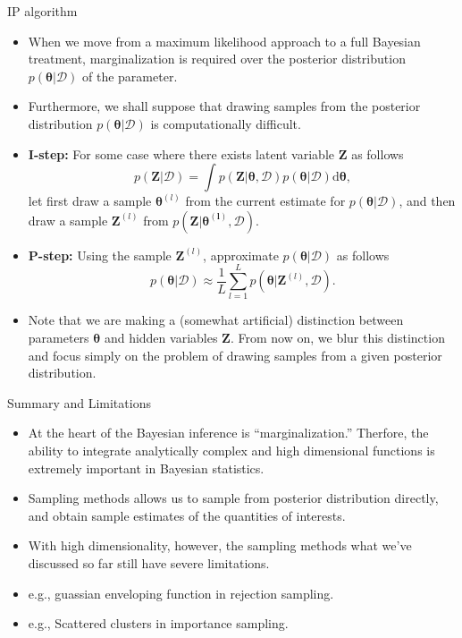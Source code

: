 \documentclass{bredelebeamer}
\begin{document}
\begin{frame}{IP algorithm}
  \begin{itemize}
    \item When we move from a maximum likelihood approach to a full Bayesian
    treatment, marginalization is required over the posterior distribution
    $p(\boldsymbol{\theta}|\mathcal{D})$ of the parameter.
    \item Furthermore, we shall suppose that drawing samples from the posterior
    distribution $p(\boldsymbol{\theta}|\mathcal{D})$ is computationally
    difficult.
    \item \textbf{I-step:}
    For some case where there exists latent variable $\mathbf{Z}$
    as follows
    \begin{equation}
      p(\mathbf{Z}|\mathcal{D})
      = \int p(\mathbf{Z|\boldsymbol{\theta}, \mathcal{D}})
      p(\boldsymbol{\theta}|\mathcal{D}) \mathrm{d} \boldsymbol{\theta},
    \end{equation}
    let first draw a sample $\boldsymbol{\theta}^{(l)}$ from the current
    estimate for $p(\boldsymbol{\theta}|\mathcal{D})$, and then draw a
    sample $\mathbf{Z}^{(l)}$ from $p(\mathbf{Z|\boldsymbol{\theta}^{(l)}, \mathcal{D}})$.
    \item \textbf{P-step:}
    Using the sample $\mathbf{Z}^{(l)}$, approximate $p(\boldsymbol{\theta}|\mathcal{D})$
    as follows
    \begin{equation}
      p(\boldsymbol{\theta}|\mathcal{D}) \approx
      \frac{1}{L} \sum_{l=1}^{L} p(\boldsymbol{\theta}|\mathbf{Z}^{(l)}, \mathcal{D}).
    \end{equation}
    \item Note that we are making a (somewhat artificial) distinction between
    parameters $\boldsymbol{\theta}$ and hidden variables $\mathbf{Z}$. From
    now on, we blur this distinction and focus simply on the problem of drawing
    samples from a given posterior distribution.
  \end{itemize}
\end{frame}

\begin{frame}{Summary and Limitations}
  \begin{itemize}
    \item At the heart of the Bayesian inference is ``marginalization.''
    Therfore, the ability to integrate analytically complex and high
    dimensional functions is extremely important in Bayesian statistics.
    \item Sampling methods allows us to sample from posterior distribution
    directly, and obtain sample estimates of the quantities of interests.
    \item With high dimensionality, however, the sampling methods what
    we've discussed so far still have severe limitations.
    \item e.g., guassian enveloping function in rejection sampling.
    \item e.g., Scattered clusters in importance sampling.
  \end{itemize}
\end{frame}
\end{document}
